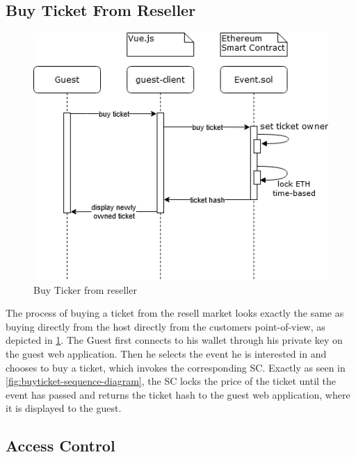 \subsection{Buy Ticket From Reseller}
\begin{figure}[H]
    \centering
    \includegraphics[width=12cm]{design/diagrams/BuyTicketFromResell.png}
    \caption{Buy Ticker from reseller}
    \label{fig:buyFromResell}
\end{figure}
The process of buying a ticket from the resell market looks exactly the same as buying directly from the host directly from the customers point-of-view, as depicted in \ref{fig:buyFromResell}. The Guest first connects to his wallet through his private key on the guest web application. Then he selects the event he is interested in and chooses to buy a ticket, which invokes the corresponding SC. Exactly as seen in \ref{fig:buyticket-sequence-diagram}, the SC locks the price of the ticket until the event has passed and returns the ticket hash to the guest web application, where it is displayed to the guest.

\subsection{Access Control}\label{subsection:access-control}

